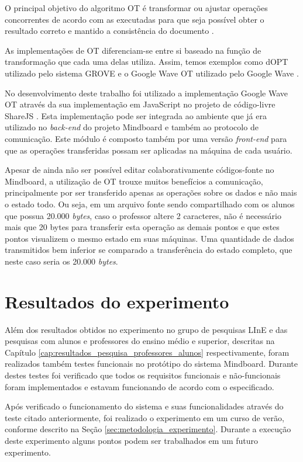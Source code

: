 O principal objetivo do algoritmo OT é transformar ou ajustar operações concorrentes de acordo com as executadas para que seja possível obter o resultado correto e mantido a consistência do documento \cite{ot}.

As implementações de OT diferenciam-se entre si baseado na função de transformação que cada uma delas utiliza. Assim, temos exemplos como dOPT utilizado pelo sistema GROVE \cite{ot} e o Google Wave OT utilizado pelo Google Wave \cite{ot2}. 

No desenvolvimento deste trabalho foi utilizado a implementação Google Wave OT através da sua implementação em JavaScript no projeto de código-livre ShareJS \cite{sharejs}. Esta implementação pode ser integrada ao ambiente que já era utilizado no \emph{back-end} do projeto Mindboard e também ao protocolo de comunicação. Este módulo é composto também por uma versão \emph{front-end} para que as operações transferidas possam ser aplicadas na máquina de cada usuário. 

Apesar de ainda não ser possível editar colaborativamente códigos-fonte no Mindboard, a utilização de OT trouxe muitos benefícios a comunicação, principalmente por ser transferido apenas as operações sobre os dados e não mais o estado todo. Ou seja, em um arquivo fonte sendo compartilhado com os alunos que possua 20.000 \emph{bytes}, caso o professor altere 2 caracteres, não é necessário mais que 20 bytes para transferir esta operação as demais pontos e que estes pontos visualizem o mesmo estado em suas máquinas. Uma quantidade de dados transmitidos bem inferior se comparado a transferência do estado completo, que neste caso seria os 20.000 \emph{bytes}.

\chapter{Resultados do experimento}
\label{cap:resultados}

Além dos resultados obtidos no experimento no grupo de pesquisas LInE e das pesquisas com alunos e professores do ensino médio e superior, descritas na Capítulo \ref{cap:resultados_pesquisa_professores_alunos} respectivamente, foram realizados também testes funcionais no protótipo do sistema Mindboard. Durante destes testes foi verificado que todos os requisitos funcionais e não-funcionais foram implementados e estavam funcionando de acordo com o especificado. 

Após verificado o funcionamento do sistema e suas funcionalidades através do teste citado anteriormente, foi realizado o experimento em um curso de verão, conforme descrito na Seção \ref{sec:metodologia_experimento}. Durante a execução deste experimento alguns pontos podem ser trabalhados em um futuro experimento. 

